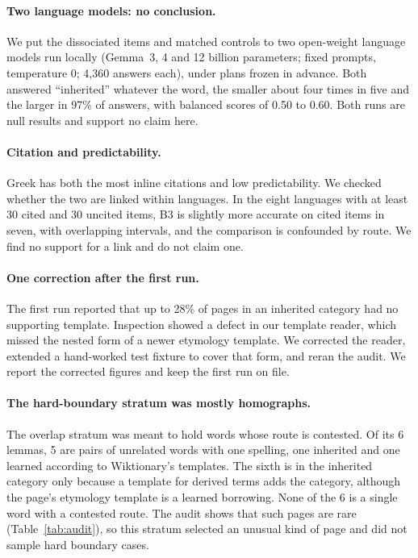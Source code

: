 \documentclass[11pt]{article}
\begin{document}
\paragraph{Two language models: no conclusion.} We put the dissociated items and matched controls to two open-weight language models run locally (Gemma~3, 4 and 12 billion parameters; fixed prompts, temperature 0; 4,360 answers each), under plans frozen in advance. Both answered ``inherited'' whatever the word, the smaller about four times in five and the larger in 97\% of answers, with balanced scores of 0.50 to 0.60. Both runs are null results and support no claim here.

\paragraph{Citation and predictability.} Greek has both the most inline citations and low predictability. We checked whether the two are linked within languages. In the eight languages with at least 30 cited and 30 uncited items, B3 is slightly more accurate on cited items in seven, with overlapping intervals, and the comparison is confounded by route. We find no support for a link and do not claim one.

\paragraph{One correction after the first run.} The first run reported that up to 28\% of pages in an inherited category had no supporting template. Inspection showed a defect in our template reader, which missed the nested form of a newer etymology template. We corrected the reader, extended a hand-worked test fixture to cover that form, and reran the audit. We report the corrected figures and keep the first run on file.

\paragraph{The hard-boundary stratum was mostly homographs.} The overlap stratum was meant to hold words whose route is contested. Of its 6 lemmas, 5 are pairs of unrelated words with one spelling, one inherited and one learned according to Wiktionary's templates. The sixth is in the inherited category only because a template for derived terms adds the category, although the page's etymology template is a learned borrowing. None of the 6 is a single word with a contested route. The audit shows that such pages are rare (Table~\ref{tab:audit}), so this stratum selected an unusual kind of page and did not sample hard boundary cases.
\end{document}
